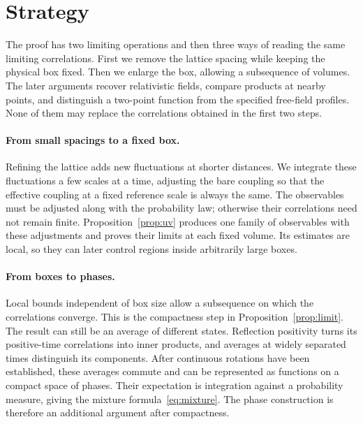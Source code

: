 \section{Strategy}\label{sec:strategy}

The proof has two limiting operations and then three ways of reading the same limiting correlations.
First we remove the lattice spacing while keeping the physical box fixed.
Then we enlarge the box, allowing a subsequence of volumes.
The later arguments recover relativistic fields, compare products at nearby points, and distinguish a two-point function from the specified free-field profiles.
None of them may replace the correlations obtained in the first two steps.

\paragraph{From small spacings to a fixed box.}
Refining the lattice adds new fluctuations at shorter distances.
We integrate these fluctuations a few scales at a time, adjusting the bare coupling so that the effective coupling at a fixed reference scale is always the same.
The observables must be adjusted along with the probability law; otherwise their correlations need not remain finite.
Proposition~\ref{prop:uv} produces one family of observables with these adjustments and proves their limits at each fixed volume.
Its estimates are local, so they can later control regions inside arbitrarily large boxes.

\paragraph{From boxes to phases.}
Local bounds independent of box size allow a subsequence on which the correlations converge.
This is the compactness step in Proposition~\ref{prop:limit}.
The result can still be an average of different states.
Reflection positivity turns its positive-time correlations into inner products, and averages at widely separated times distinguish its components.
After continuous rotations have been established, these averages commute and can be represented as functions on a compact space of phases.
Their expectation is integration against a probability measure, giving the mixture formula~\eqref{eq:mixture}.
The phase construction is therefore an additional argument after compactness.

